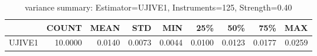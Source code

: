 \begin{table}[ht]
\centering
\caption{variance summary: Estimator=UJIVE1, Instruments=125, Strength=0.40}
\begin{tabular}{lrrrrrrrr}
\toprule
 & COUNT & MEAN & STD & MIN & 25\% & 50\% & 75\% & MAX \\
\midrule
UJIVE1 & 10.0000 & 0.0140 & 0.0073 & 0.0044 & 0.0100 & 0.0123 & 0.0177 & 0.0259 \\
\bottomrule
\end{tabular}
\end{table}
